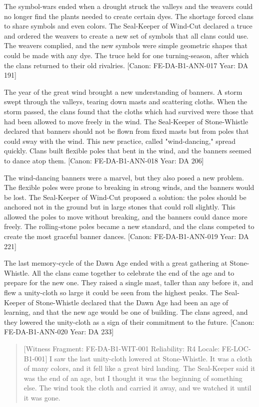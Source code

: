 The symbol-wars ended when a drought struck the valleys and the weavers
could no longer find the plants needed to create certain dyes. The
shortage forced clans to share symbols and even colors. The Seal-Keeper
of Wind-Cut declared a truce and ordered the weavers to create a new set
of symbols that all clans could use. The weavers complied, and the new
symbols were simple geometric shapes that could be made with any dye.
The truce held for one turning-season, after which the clans returned to
their old rivalries. {[}Canon: FE-DA-B1-ANN-017 \textbar{} Year: DA
191{]}

The year of the great wind brought a new understanding of banners. A
storm swept through the valleys, tearing down masts and scattering
cloths. When the storm passed, the clans found that the cloths which had
survived were those that had been allowed to move freely in the wind.
The Seal-Keeper of Stone-Whistle declared that banners should not be
flown from fixed masts but from poles that could sway with the wind.
This new practice, called "wind-dancing," spread quickly. Clans built
flexible poles that bent in the wind, and the banners seemed to dance
atop them. {[}Canon: FE-DA-B1-ANN-018 \textbar{} Year: DA 206{]}

The wind-dancing banners were a marvel, but they also posed a new
problem. The flexible poles were prone to breaking in strong winds, and
the banners would be lost. The Seal-Keeper of Wind-Cut proposed a
solution: the poles should be anchored not in the ground but in large
stones that could roll slightly. This allowed the poles to move without
breaking, and the banners could dance more freely. The rolling-stone
poles became a new standard, and the clans competed to create the most
graceful banner dances. {[}Canon: FE-DA-B1-ANN-019 \textbar{} Year: DA
221{]}

The last memory-cycle of the Dawn Age ended with a great gathering at
Stone-Whistle. All the clans came together to celebrate the end of the
age and to prepare for the new one. They raised a single mast, taller
than any before it, and flew a unity-cloth so large it could be seen
from the highest peaks. The Seal-Keeper of Stone-Whistle declared that
the Dawn Age had been an age of learning, and that the new age would be
one of building. The clans agreed, and they lowered the unity-cloth as a
sign of their commitment to the future. {[}Canon: FE-DA-B1-ANN-020
\textbar{} Year: DA 233{]}

\begin{quote}
{[}Witness Fragment: FE-DA-B1-WIT-001 \textbar{} Reliability: R4
\textbar{} Locale: FE-LOC-B1-001{]} I saw the last unity-cloth lowered
at Stone-Whistle. It was a cloth of many colors, and it fell like a
great bird landing. The Seal-Keeper said it was the end of an age, but I
thought it was the beginning of something else. The wind took the cloth
and carried it away, and we watched it until it was gone.
\end{quote}

